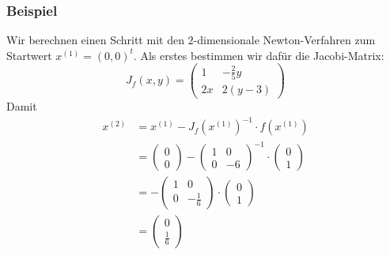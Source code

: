 \begin{frame}\frametitle{Beispiel}
Wir berechnen einen Schritt mit den $2$-dimensionale Newton-Verfahren zum Startwert $x^{(1)}=(0,0)^t$. Als erstes bestimmen wir dafür die Jacobi-Matrix:
$$
J_f(x,y)=\begin{pmatrix}1 & - \frac{2}{5}y\\ 2x & 2(y-3) \end{pmatrix}
$$\pause
Damit
\begin{align*}
x^{(2)}&=x^{(1)} - J_f(x^{(1)})^{-1}\cdot f(x^{(1)})\\
&=\begin{pmatrix} 0 \\0 \end{pmatrix} - \begin{pmatrix}1 & 0\\0 & -6 \end{pmatrix}^{-1}\cdot \begin{pmatrix} 0 \\1 \end{pmatrix} \\
&=- \begin{pmatrix}1 & 0\\0 & -\frac{1}{6} \end{pmatrix}\cdot \begin{pmatrix} 0 \\1 \end{pmatrix}\\
&=\begin{pmatrix} 0 \\\frac{1}{6} \end{pmatrix}
\end{align*}
\end{frame}

